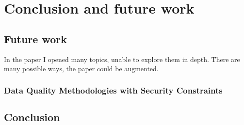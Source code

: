 \chapter{Conclusion and future work}\label{ch:conclusion-and-future-work}

\section{Future work}\label{sec:future-work}

In the paper I opened many topics, unable to explore them in depth.
There are many possible ways, the paper could be augmented.

\subsection{Data Quality Methodologies with Security Constraints}

\section{Conclusion}\label{sec:conclusion}
